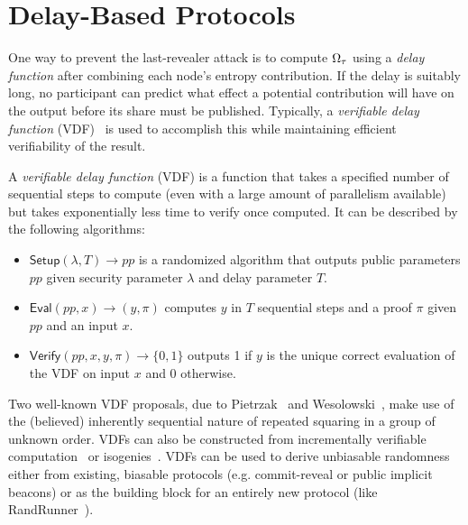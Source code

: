 
\section{Delay-Based Protocols}
\label{section:delay}
One way to prevent the last-revealer attack is to compute $\Omega_\tau$ using a \emph{delay function} after combining each node's entropy contribution. If the delay is suitably long, no participant can predict what effect a potential contribution will have on the output before its share must be published. Typically, a \emph{verifiable delay function} (VDF)~\cite{boneh2018verifiable,boneh2018survey} is used to accomplish this while maintaining efficient verifiability of the result.

\begin{definition}
A \textit{verifiable delay function} (VDF) is a function that takes a specified number of sequential steps to compute (even with a large amount of parallelism available) but takes exponentially less time to verify once computed. It can be described by the following algorithms:
\begin{itemize}
\item $\mathsf{Setup}(\lambda, T) \rightarrow pp$ is a randomized algorithm that outputs public parameters $pp$ given security parameter $\lambda$ and delay parameter $T$.
\item $\mathsf{Eval}(pp, x) \rightarrow (y, \pi)$ computes $y$ in $T$ sequential steps and a proof $\pi$ given $pp$ and an input $x$.
\item $\mathsf{Verify}(pp, x, y, \pi) \rightarrow \{0, 1\}$ outputs 1 if $y$ is the unique correct evaluation of the VDF on input $x$ and 0 otherwise.
\end{itemize}
\end{definition}

Two well-known VDF proposals, due to Pietrzak~\cite{pietrzak2018simple} and Wesolowski~\cite{wesolowski2019efficient}, make use of the (believed) inherently sequential nature of repeated squaring in a group of unknown order.
VDFs can also be constructed from incrementally verifiable computation~\cite{boneh2018verifiable,khovratovich2022minroot} or isogenies~\cite{de2019verifiable}.
VDFs can be used to derive unbiasable randomness either from existing, biasable protocols (e.g. commit-reveal or public implicit beacons) or as the building block for an entirely new protocol (like RandRunner~\cite{schindler2021randrunner}).

